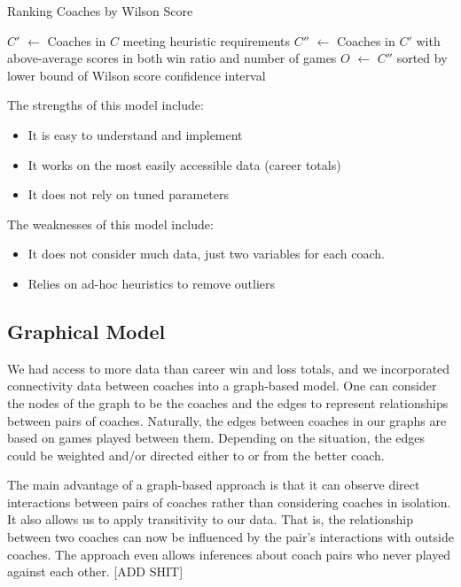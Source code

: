 \documentclass[titlepage,12pt]{article}
\newcommand*\Let[2]{\State #1 $\gets$ #2}
\begin{document}
\renewcommand{\algorithmicrequire}{\textbf{Input:}}
\renewcommand{\algorithmicensure}{\textbf{Output:}}
\begin{algorithm}[H]
  \caption{Ranking Coaches by Wilson Score}
  \begin{algorithmic}
	\Let{$C'$}{Coaches in $C$ meeting heuristic requirements}
	\Let{$C''$}{Coaches in $C'$ with above-average scores in both win ratio and number of games}
	\Let{$O$}{$C''$ sorted by lower bound of Wilson score confidence interval}
  \end{algorithmic}
\end{algorithm}

\noindent The strengths of this model include:
\begin{itemize}
\item It is easy to understand and implement
\item It works on the most easily accessible data (career totals)
\item It does not rely on tuned parameters
\end{itemize}

\noindent The weaknesses of this model include:
\begin{itemize}
\item It does not consider much data, just two variables for each coach.
\item Relies on ad-hoc heuristics to remove outliers
\end{itemize}

\subsection{Graphical Model}
We had access to more data than career win and loss totals, and we incorporated connectivity data between coaches into a graph-based model. One can consider the nodes of the graph to be the coaches and the edges to represent relationships between pairs of coaches. Naturally, the edges between coaches in our graphs are based on games played between them. Depending on the situation, the edges could be weighted and/or directed either to or from the better coach.

The main advantage of a graph-based approach is that it can observe direct interactions between pairs of coaches rather than considering coaches in isolation. It also allows us to apply transitivity to our data. That is, the relationship between two coaches can now be influenced by the pair's interactions with outside coaches. The approach even allows inferences about coach pairs who never played against each other. [ADD SHIT]
\end{document}
